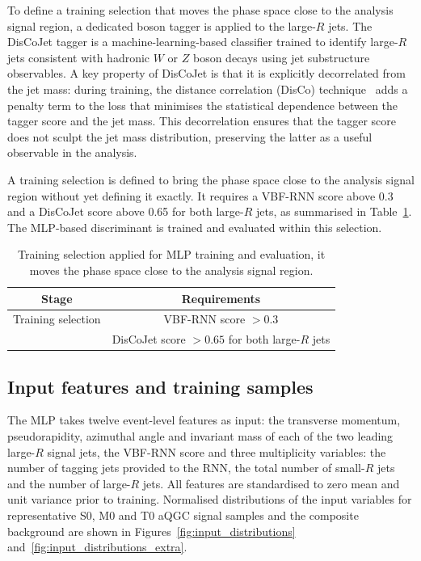 To define a training selection that moves the phase space close to the analysis signal region, a dedicated boson tagger is applied to the large-$R$ jets. The DisCoJet tagger is a machine-learning-based classifier trained to identify large-$R$ jets consistent with hadronic $W$ or $Z$ boson decays using jet substructure observables. A key property of DisCoJet is that it is explicitly decorrelated from the jet mass: during training, the distance correlation (DisCo) technique~\cite{Kasieczka:2020DisCo} adds a penalty term to the loss that minimises the statistical dependence between the tagger score and the jet mass. This decorrelation ensures that the tagger score does not sculpt the jet mass distribution, preserving the latter as a useful observable in the analysis.

A training selection is defined to bring the phase space close to the analysis signal region without yet defining it exactly. It requires a VBF-RNN score above 0.3 and a DisCoJet score above 0.65 for both large-$R$ jets, as summarised in Table~\ref{tab:mlp_selection}. The MLP-based discriminant is trained and evaluated within this selection.

\begin{table}[htbp]
  \centering
  \caption{Training selection applied for MLP training and evaluation, it moves the phase space close to the analysis signal region.}
  \label{tab:mlp_selection}
  \begin{tabular}{|c|c|}
    \hline
    \textbf{Stage} & \textbf{Requirements} \\
    \hline
    Training selection & VBF-RNN score $> 0.3$\\
                            & DisCoJet score $> 0.65$ for both large-$R$ jets \\
    \hline
  \end{tabular}
\end{table}

\subsection{Input features and training samples}

The MLP takes twelve event-level features as input: the transverse momentum, pseudorapidity, azimuthal angle and invariant mass of each of the two leading large-$R$ signal jets, the VBF-RNN score and three multiplicity variables: the number of tagging jets provided to the RNN, the total number of small-$R$ jets and the number of large-$R$ jets. All features are standardised to zero mean and unit variance prior to training. Normalised distributions of the input variables for representative S0, M0 and T0 aQGC signal samples and the composite background are shown in Figures~\ref{fig:input_distributions} and~\ref{fig:input_distributions_extra}.

